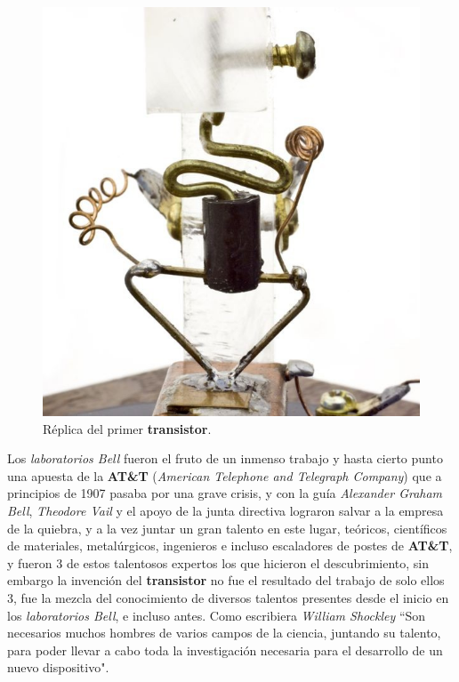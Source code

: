\begin{figure}[htb]
	\centering
	\includegraphics[scale = 0.2]{Graphics/first_transistor_replica.jpg}
	\caption{Réplica del primer \textbf{transistor}.}
	\label{fig:3}
\end{figure}

Los \emph{laboratorios Bell} fueron el fruto de un inmenso trabajo y hasta cierto punto una apuesta de la \textbf{AT\&T}
(\emph{American Telephone and Telegraph Company}) que a principios de 1907 pasaba por una grave crisis, y con la guía
\emph{Alexander Graham Bell}, \emph{Theodore Vail} y el apoyo de la junta directiva lograron salvar a la empresa de la quiebra, 
y a la vez juntar un gran talento en este lugar, teóricos, científicos de materiales, metalúrgicos, ingenieros e incluso escaladores
de postes de \textbf{AT\&T}, y fueron 3 de estos talentosos expertos los que hicieron el descubrimiento, sin embargo la invención del
\textbf{transistor} no fue el resultado del trabajo de solo ellos 3, fue la mezcla del conocimiento de diversos talentos presentes
desde el inicio en los \emph{laboratorios Bell}, e incluso antes. Como escribiera \emph{William Shockley} “Son necesarios muchos hombres
de varios campos de la ciencia, juntando su talento, para poder llevar a cabo toda la investigación necesaria para el desarrollo de un
nuevo dispositivo".\\

\section*{}
